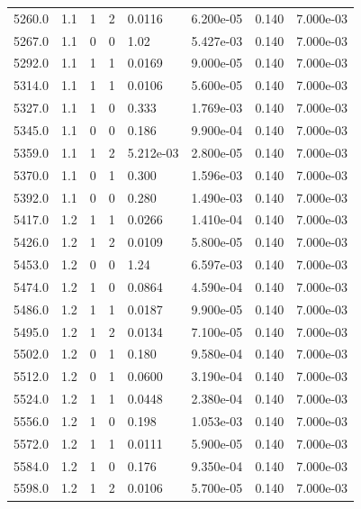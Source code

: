 \documentclass[preview]{standalone}
\begin{document}
{{{{{{{{{{\begin{tabular}{L{1.2cm}C{1.2cm} C{0.3cm}C{0.5cm} C{1.4cm}C{1.4cm} C{1.4cm}C{1.4cm}}
  5260.0  &   1.1  & 1     &  2 &  0.0116  & 6.200e-05  & 0.140 &  7.000e-03   \\ 
  5267.0  &   1.1  & 0     &  0 &  1.02  & 5.427e-03  & 0.140 &  7.000e-03   \\ 
  5292.0  &   1.1  & 1     &  1 &  0.0169  & 9.000e-05  & 0.140 &  7.000e-03   \\ 
  5314.0  &   1.1  & 1     &  1 &  0.0106  & 5.600e-05  & 0.140 &  7.000e-03   \\ 
  5327.0  &   1.1  & 1     &  0 &  0.333  & 1.769e-03  & 0.140 &  7.000e-03   \\ 
  5345.0  &   1.1  & 0     &  0 &  0.186  & 9.900e-04  & 0.140 &  7.000e-03   \\ 
  5359.0  &   1.1  & 1     &  2 &  5.212e-03  & 2.800e-05  & 0.140 &  7.000e-03   \\ 
  5370.0  &   1.1  & 0     &  1 &  0.300  & 1.596e-03  & 0.140 &  7.000e-03   \\ 
  5392.0  &   1.1  & 0     &  0 &  0.280  & 1.490e-03  & 0.140 &  7.000e-03   \\ 
  5417.0  &   1.2  & 1     &  1 &  0.0266  & 1.410e-04  & 0.140 &  7.000e-03   \\ 
  5426.0  &   1.2  & 1     &  2 &  0.0109  & 5.800e-05  & 0.140 &  7.000e-03   \\ 
  5453.0  &   1.2  & 0     &  0 &  1.24  & 6.597e-03  & 0.140 &  7.000e-03   \\ 
  5474.0  &   1.2  & 1     &  0 &  0.0864  & 4.590e-04  & 0.140 &  7.000e-03   \\ 
  5486.0  &   1.2  & 1     &  1 &  0.0187  & 9.900e-05  & 0.140 &  7.000e-03   \\ 
  5495.0  &   1.2  & 1     &  2 &  0.0134  & 7.100e-05  & 0.140 &  7.000e-03   \\ 
  5502.0  &   1.2  & 0     &  1 &  0.180  & 9.580e-04  & 0.140 &  7.000e-03   \\ 
  5512.0  &   1.2  & 0     &  1 &  0.0600  & 3.190e-04  & 0.140 &  7.000e-03   \\ 
  5524.0  &   1.2  & 1     &  1 &  0.0448  & 2.380e-04  & 0.140 &  7.000e-03   \\ 
  5556.0  &   1.2  & 1     &  0 &  0.198  & 1.053e-03  & 0.140 &  7.000e-03   \\ 
  5572.0  &   1.2  & 1     &  1 &  0.0111  & 5.900e-05  & 0.140 &  7.000e-03   \\ 
  5584.0  &   1.2  & 1     &  0 &  0.176  & 9.350e-04  & 0.140 &  7.000e-03   \\ 
  5598.0  &   1.2  & 1     &  2 &  0.0106  & 5.700e-05  & 0.140 &  7.000e-03   \\ 

\end{tabular}}}}}}}}}}}
\end{document}
